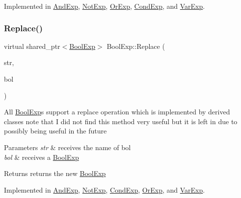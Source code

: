 Implemented in \mbox{\hyperlink{classAndExp_ac930ab2d9098904596aea6b2b6429d90}{And\+Exp}}, \mbox{\hyperlink{classNotExp_a7363cb79787e02ca362a4ea6cdd6d7e2}{Not\+Exp}}, \mbox{\hyperlink{classOrExp_a8e535ae2da801bf5a4e8c9fbf3426a8b}{Or\+Exp}}, \mbox{\hyperlink{classCondExp_a556da724a343a45e1bab5da0a3f8a091}{Cond\+Exp}}, and \mbox{\hyperlink{classVarExp_af50f77454d193ebfd7633f5f20becaf4}{Var\+Exp}}.

\mbox{\label{classBoolExp_a6448b7121c238759cc9cc8e48d6f8773}} 
\subsubsection{\texorpdfstring{Replace()}{Replace()}}
{\footnotesize\ttfamily virtual shared\+\_\+ptr$<$\mbox{\hyperlink{classBoolExp}{Bool\+Exp}}$>$ Bool\+Exp\+::\+Replace (\begin{DoxyParamCaption}\item[{string}]{str,  }\item[{\mbox{\hyperlink{classBoolExp}{Bool\+Exp}} \&}]{bol }\end{DoxyParamCaption})\hspace{0.3cm}{\ttfamily [pure virtual]}}

All \mbox{\hyperlink{classBoolExp}{Bool\+Exp}}\textquotesingle{}s support a replace operation which is implemented by derived classes note that I did not find this method very useful but it is left in due to possibly being useful in the future 
\begin{DoxyParams}{Parameters}
{\em str} & receives the name of bol \\
\hline
{\em bol} & receives a \mbox{\hyperlink{classBoolExp}{Bool\+Exp}} \\
\hline
\end{DoxyParams}
\begin{DoxyReturn}{Returns}
returns the new \mbox{\hyperlink{classBoolExp}{Bool\+Exp}} 
\end{DoxyReturn}


Implemented in \mbox{\hyperlink{classAndExp_ac6176c316c96da57f587fe7731fc414b}{And\+Exp}}, \mbox{\hyperlink{classNotExp_aeba42c37b59e0eaaf981260e4b163d98}{Not\+Exp}}, \mbox{\hyperlink{classCondExp_a0bbcb0b6822b47bee1baa09d7c88f4d0}{Cond\+Exp}}, \mbox{\hyperlink{classOrExp_a256171f2cf3d3165745d6df9390d9ab7}{Or\+Exp}}, and \mbox{\hyperlink{classVarExp_a0b716a76069a7fad3b99b86a9bd9d331}{Var\+Exp}}.

